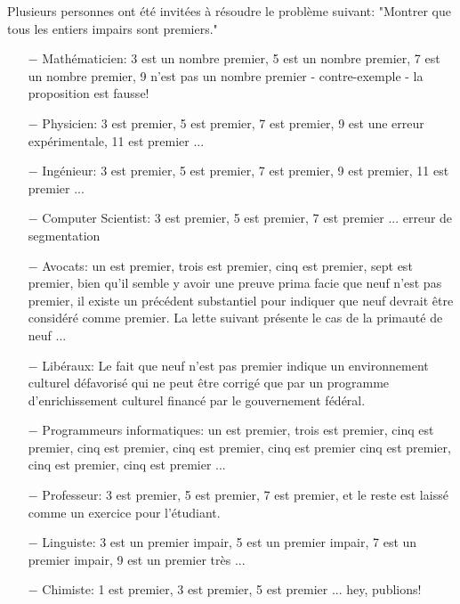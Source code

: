 Plusieurs personnes ont été invitées à résoudre le problème suivant: "Montrer que tous les entiers impairs sont premiers."

\begin{itemize}	 
	\item[$-$] Mathématicien: 3 est un nombre premier, 5 est un nombre premier, 7 est un nombre premier, 9 n'est pas un nombre premier - contre-exemple - la proposition est fausse!

	\item[$-$] Physicien: 3 est premier, 5 est premier, 7 est  premier, 9 est une erreur expérimentale, 11 est premier ...

	\item[$-$] Ingénieur: 3 est premier, 5 est premier, 7 est  premier, 9 est premier, 11 est premier ...

	\item[$-$] Computer Scientist: 3 est premier, 5 est premier, 7 est  premier ... erreur de segmentation

	\item[$-$] Avocats: un est premier, trois est premier, cinq est premier, sept est premier, bien qu'il semble y avoir une preuve prima facie que neuf n'est pas premier, il existe un précédent substantiel pour indiquer que neuf devrait être considéré comme premier. La lette  suivant présente le cas de la primauté de neuf ...

	\item[$-$] Libéraux: Le fait que neuf n'est pas premier indique un environnement culturel défavorisé qui ne peut être corrigé que par un programme d'enrichissement culturel financé par le gouvernement fédéral.

	\item[$-$] Programmeurs informatiques: un est premier, trois est premier, cinq est premier, cinq est premier, cinq est premier, cinq est premier cinq est premier, cinq est premier, cinq est premier ...

	\item[$-$] Professeur: 3 est premier, 5 est premier, 7 est premier, et le reste est laissé comme un exercice pour l'étudiant.

	\item[$-$] Linguiste: 3 est un premier impair, 5 est un premier impair, 7 est un premier impair, 9 est un premier très ...

	\item[$-$] Chimiste: 1 est premier, 3  est premier, 5  est premier ... hey, publions!


\end{itemize}
